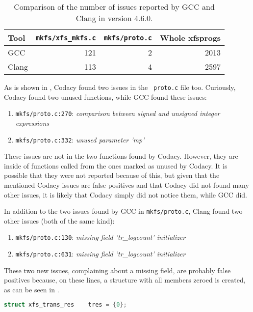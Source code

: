 \begin{table}[h]
\begin{tabular}{|l||r|r||r|}
\hline
Tool & {\tt mkfs/xfs\_mkfs.c} & {\tt mkfs/proto.c} & Whole xfsprogs \\
\hline
GCC & 121 & 2 & 2013 \\
\hline
Clang & 113 & 4 & 2597 \\
\hline
\end{tabular}
\caption{Comparison of the number of issues reported by GCC and Clang in version
4.6.0.}
\label{tab:results:gcc:4.6}
\end{table}

As is shown in , Codacy found two issues in the {\tt
proto.c} file too. Curiously, Codacy found two unused functions, while GCC
found these issues:
\begin{enumerate}
	\item {\tt mkfs/proto.c:270}: {\em comparison between signed and unsigned
		integer expressions}
	\item {\tt mkfs/proto.c:332}: {\em unused parameter 'mp'}
\end{enumerate}

These issues are not in the two functions found by Codacy. However, they are
inside of functions called from the ones marked as unused by Codacy. It is
possible that they were not reported because of this, but given that the
mentioned Codacy issues are false positives and that Codacy did not found many
other issues, it is likely that Codacy simply did not notice them, while GCC
did.

In addition to the two issues found by GCC in {\tt mkfs/proto.c}, Clang
found two other issues (both of the same kind):
\begin{enumerate}
	\item {\tt mkfs/proto.c:130}: {\em missing field 'tr\_logcount'
		initializer}
	\item {\tt mkfs/proto.c:631}: {\em missing field 'tr\_logcount'
		initializer}
\end{enumerate}

These two new issues, complaining about a missing field, are probably false
positives because, on these lines, a structure with all members zeroed is
created, as can be seen in .

\begin{lstlisting}[frame=none, basicstyle=\footnotesize\ttfamily,
language=C, numbers=none, numberstyle=\tiny\color{black},caption=
{One of the two lines on which Clang reports a missing field in structure
initialization.},
label={lst:results:zeroedStruct}]
struct xfs_trans_res    tres = {0};
\end{lstlisting}

